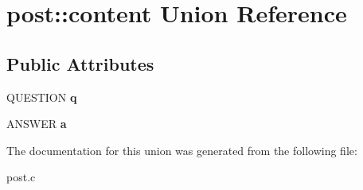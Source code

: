 \hypertarget{unionpost_1_1content}{}\section{post\+:\+:content Union Reference}
\label{unionpost_1_1content}
\subsection*{Public Attributes}
\begin{DoxyCompactItemize}
\item 
Q\+U\+E\+S\+T\+I\+ON {\bfseries q}\hypertarget{unionpost_1_1content_a6702b6b622f46fa8fb88b0efe3307f11}{}\label{unionpost_1_1content_a6702b6b622f46fa8fb88b0efe3307f11}

\item 
A\+N\+S\+W\+ER {\bfseries a}\hypertarget{unionpost_1_1content_a5fec346f6c63f1ce286c7247f3e88385}{}\label{unionpost_1_1content_a5fec346f6c63f1ce286c7247f3e88385}

\end{DoxyCompactItemize}


The documentation for this union was generated from the following file\+:\begin{DoxyCompactItemize}
\item 
post.\+c\end{DoxyCompactItemize}
